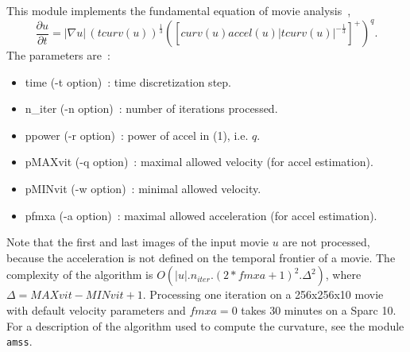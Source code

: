 This module implements the fundamental equation of movie analysis~\cite{alvarez.guichard.ea:axioms},
\begin{equation}
\frac{\partial u}{\partial t} = |\nabla u| \,(t curv(u))^{\frac{1}{3}} \left(\left[curv(u) accel(u) |t curv(u)|^{-\frac{1}{3}} \right] ^+ \right)^q.
\end{equation}
The parameters are~:
\begin{itemize}
\item time (-t option)~: time discretization step.
\item n\_iter (-n option)~: number of iterations processed.
\item ppower (-r option)~: power of accel in (1), i.e. $q$.
\item pMAXvit (-q option)~: maximal allowed velocity (for accel estimation).
\item pMINvit (-w option)~: minimal allowed velocity.
\item pfmxa (-a option)~: maximal allowed acceleration (for accel estimation).
\end{itemize}

Note that the first and last images of the input movie $u$ are not processed, because the acceleration is not defined on the temporal frontier of a movie. 
The complexity of the algorithm is $O(|u|.n_{iter}.(2*fmxa+1)^2.\Delta ^2)$, where $\Delta =MAXvit-MINvit+1$.
Processing one iteration on a 256x256x10 movie with default velocity parameters and $fmxa=0$ takes 30 minutes on a Sparc 10. For a description
of the algorithm used to compute the curvature, see the module \verb+amss+.
